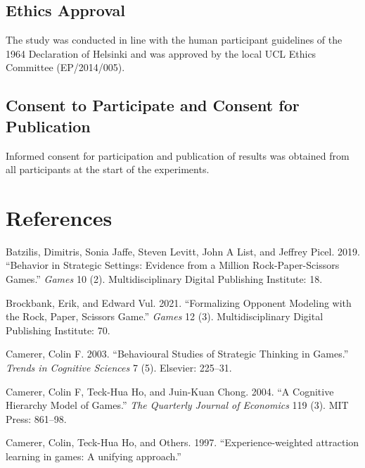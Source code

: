 \documentclass[smallextended]{svjour3}       %
\begin{document}
\hypertarget{ethics-approval}{%
\subsection{Ethics Approval}\label{ethics-approval}}

The study was conducted in line with the human participant guidelines of
the 1964 Declaration of Helsinki and was approved by the local UCL
Ethics Committee (EP/2014/005).

\hypertarget{consent-to-participate-and-consent-for-publication}{%
\subsection{Consent to Participate and Consent for
Publication}\label{consent-to-participate-and-consent-for-publication}}

Informed consent for participation and publication of results was
obtained from all participants at the start of the experiments.

\hypertarget{references}{%
\section*{References}\label{references}}

\hypertarget{refs}{}
\leavevmode\hypertarget{ref-batzilis2019behavior}{}%
Batzilis, Dimitris, Sonia Jaffe, Steven Levitt, John A List, and Jeffrey
Picel. 2019. ``Behavior in Strategic Settings: Evidence from a Million
Rock-Paper-Scissors Games.'' \emph{Games} 10 (2). Multidisciplinary
Digital Publishing Institute: 18.

\leavevmode\hypertarget{ref-brockbank2021formalizing}{}%
Brockbank, Erik, and Edward Vul. 2021. ``Formalizing Opponent Modeling
with the Rock, Paper, Scissors Game.'' \emph{Games} 12 (3).
Multidisciplinary Digital Publishing Institute: 70.

\leavevmode\hypertarget{ref-camerer2003behavioural}{}%
Camerer, Colin F. 2003. ``Behavioural Studies of Strategic Thinking in
Games.'' \emph{Trends in Cognitive Sciences} 7 (5). Elsevier: 225--31.

\leavevmode\hypertarget{ref-camerer2004cognitive}{}%
Camerer, Colin F, Teck-Hua Ho, and Juin-Kuan Chong. 2004. ``A Cognitive
Hierarchy Model of Games.'' \emph{The Quarterly Journal of Economics}
119 (3). MIT Press: 861--98.

\leavevmode\hypertarget{ref-camerer1997experience}{}%
Camerer, Colin, Teck-Hua Ho, and Others. 1997. ``Experience-weighted
attraction learning in games: A unifying approach.''
\end{document}
